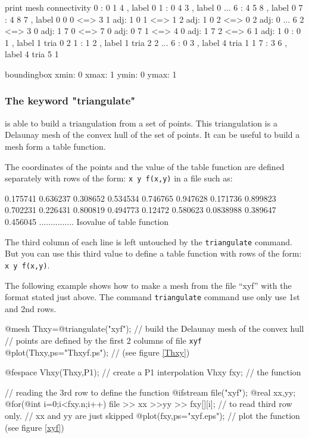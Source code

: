 \documentclass[a4paper,twoside,12pt]{book}
\begin{document}
 print mesh connectivity
0 :  0 1 4 , label  0
1 :  0 4 3 , label  0
...
6 :  4 5 8 , label  0
7 :  4 8 7 , label  0
0 0 <=>  3 1  adj: 1
0 1 <=>  1 2  adj: 1
0 2 <=>  0 2  adj: 0
...
6 2 <=>  3 0  adj: 1
7 0 <=>  7 0  adj: 0
7 1 <=>  4 0  adj: 1
7 2 <=>  6 1  adj: 1
0 : 0 1 , label 1 tria  0 2
1 : 1 2 , label 1 tria  2 2
...
6 : 0 3 , label 4 tria  1 1
7 : 3 6 , label 4 tria  5 1

 boundingbox  xmin: 0 xmax: 1 ymin: 0 ymax: 1
\eFF


\subsubsection{The keyword "triangulate"}

\freefempp is able to build a triangulation from a set of points. This
triangulation is a Delaunay mesh of the convex hull of the set of points.
It can be useful to build a mesh form a table function.

The coordinates of the points and the value of the table function
are defined separately with rows of the form: \texttt{x y f(x,y)}
in a file such as:

 0.175741 0.636237
0.308652 0.534534 0.746765
0.947628 0.171736 0.899823
0.702231 0.226431 0.800819
0.494773 0.12472 0.580623
0.0838988 0.389647 0.456045
...............
\eFF
{Isovalue of table function}

The third column of each line is left untouched by the
\texttt{triangulate} command. But you can use this third value to
define a table function with rows of the form: \texttt{x y f(x,y)}.


The following example shows how to make a mesh from the file ``xyf''
with the format stated just above.
The command
\texttt{triangulate} command use only use 1st and 2nd rows.


\bFF
@mesh Thxy=@triangulate("xyf"); // build the Delaunay mesh of the convex hull
// points are defined by the first 2 columns of file \texttt{xyf}
@plot(Thxy,ps="Thxyf.ps"); // (see figure  \ref{Thxy})

@fespace Vhxy(Thxy,P1); // create a P1 interpolation
Vhxy fxy; // the function

// reading the 3rd row to define the function
{ @ifstream file("xyf");
   @real xx,yy;
   @for(@int i=0;i<fxy.n;i++)
   file >> xx >>yy >> fxy[][i];  // to read third row only.
   // xx and yy are just skipped
}
@plot(fxy,ps="xyf.eps"); // plot the function (see figure  \ref{xyf})
\eFF
\end{document}
